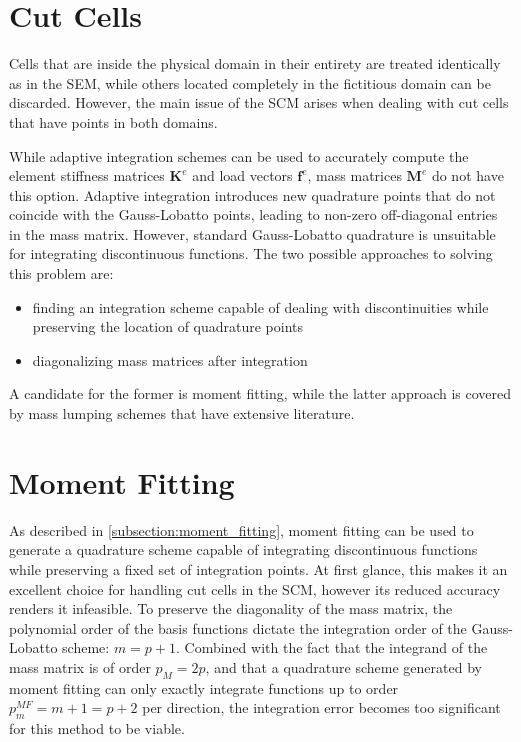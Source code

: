 %
\section{Cut Cells}
\label{section:cutcells}
%

Cells that are inside the physical domain in their entirety are treated identically as in the SEM, while others located completely in the fictitious domain can be discarded. However, the main issue of the SCM arises when dealing with cut cells that have points in both domains.

While adaptive integration schemes can be used to accurately compute the element stiffness matrices $\mathbf K^e$ and load vectors $\mathbf f^e$, mass matrices $\mathbf M^e$ do not have this option. Adaptive integration introduces new quadrature points that do not coincide with the Gauss-Lobatto points, leading to non-zero off-diagonal entries in the mass matrix. However, standard Gauss-Lobatto quadrature is unsuitable for integrating discontinuous functions. The two possible approaches to solving this problem are:

\begin{itemize}
	\item finding an integration scheme capable of dealing with discontinuities while preserving the location of quadrature points
	\item diagonalizing mass matrices after integration
\end{itemize}

A candidate for the former is moment fitting, while the latter approach is covered by mass lumping schemes that have extensive literature.

%
\section{Moment Fitting}
\label{section:moment_fitting}
%

As described in \ref{subsection:moment_fitting}, moment fitting can be used to generate a quadrature scheme capable of integrating discontinuous functions while preserving a fixed set of integration points. At first glance, this makes it an excellent choice for handling cut cells in the SCM, however its reduced accuracy renders it infeasible. To preserve the diagonality of the mass matrix, the polynomial order of the basis functions dictate the integration order of the Gauss-Lobatto scheme: $m=p+1$. Combined with the fact that the integrand of the mass matrix is of order $p_M=2p$, and that a quadrature scheme generated by moment fitting can only exactly integrate functions up to order $p_m^{MF}=m+1=p+2$ per direction, the integration error becomes too significant for this method to be viable.

